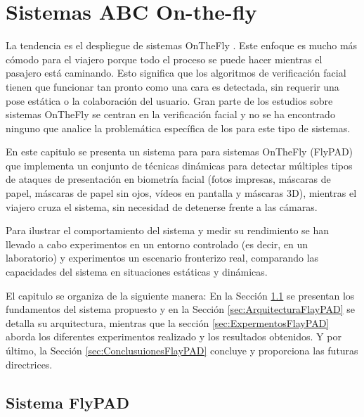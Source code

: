 \chapter{Sistemas ABC On-the-fly}\label{ch:ABC_OnTheFly}

La tendencia es el despliegue de sistemas  \gls{OnTheFly} \cite{raghavendra2013robust}. Este enfoque es mucho más cómodo para el viajero porque todo el proceso se puede hacer mientras el pasajero está caminando. Esto significa que los algoritmos de verificación facial tienen que funcionar tan pronto como una cara es detectada, sin requerir una pose estática o la colaboración del usuario. Gran parte de los estudios sobre sistemas  \gls{OnTheFly} se centran en la verificación facial y no se ha encontrado ninguno que analice la problemática específica de los  para este tipo de sistemas.

En este capitulo se presenta un sistema  para para sistemas  \gls{OnTheFly} (\gls{FlyPAD}) que implementa un conjunto de técnicas dinámicas para detectar múltiples tipos de ataques de presentación en biometría facial (fotos impresas, máscaras de papel, máscaras de papel sin ojos, vídeos en pantalla y máscaras $3$D), mientras el viajero cruza el sistema, sin necesidad de detenerse frente a las cámaras. 

Para ilustrar el comportamiento del sistema y medir su rendimiento se han llevado a cabo experimentos en un entorno controlado (es decir, en un laboratorio) y experimentos un escenario fronterizo real, comparando las capacidades del sistema  en situaciones estáticas y dinámicas.

El capitulo se organiza de la siguiente manera: En la Sección \ref{sec:SistemaFlayPAD} se presentan los fundamentos del sistema propuesto y en la Sección \ref{sec:ArquitecturaFlayPAD} se detalla su arquitectura, mientras que la sección \ref{sec:ExpermentosFlayPAD} aborda los diferentes experimentos realizado y los resultados obtenidos. Y por último, la Sección \ref{sec:ConclusuionesFlayPAD} concluye y proporciona las futuras directrices.

\section{Sistema FlyPAD}\label{sec:SistemaFlayPAD}

